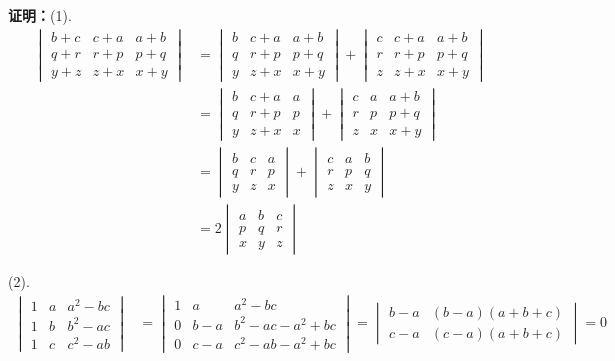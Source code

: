 {\bf 证明：}(1).
\begin{align*}
\begin{vmatrix} b+c & c+a & a+b \\ q+r & r+p & p+q \\ y+z & z+x & x+y \end{vmatrix} & = \begin{vmatrix} b & c+a & a+b \\ q & r+p & p+q \\ y & z+x & x+y \end{vmatrix} + \begin{vmatrix} c & c+a & a+b \\ r & r+p & p+q \\ z & z+x & x+y \end{vmatrix} \\
& = \begin{vmatrix} b & c+a & a \\ q & r+p & p \\ y & z+x & x \end{vmatrix} + \begin{vmatrix} c & a & a+b \\ r & p & p+q \\ z & x & x+y \end{vmatrix} \\
& = \begin{vmatrix} b & c & a \\ q & r & p \\ y & z & x \end{vmatrix} + \begin{vmatrix} c & a & b \\ r & p & q \\ z & x & y \end{vmatrix} \\
& = 2 \begin{vmatrix} a & b & c \\ p & q & r \\ x & y & z \end{vmatrix}
\end{align*}

(2).
\begin{align*}
\begin{vmatrix} 1 & a & a^2-bc \\ 1 & b & b^2-ac \\ 1 & c & c^2-ab \end{vmatrix} & = \begin{vmatrix} 1 & a & a^2-bc \\ 0 & b-a & b^2-ac-a^2+bc \\ 0 & c-a & c^2-ab-a^2+bc \end{vmatrix} = \begin{vmatrix} b-a & (b-a)(a+b+c) \\ c-a & (c-a)(a+b+c) \end{vmatrix} = 0
\end{align*}


